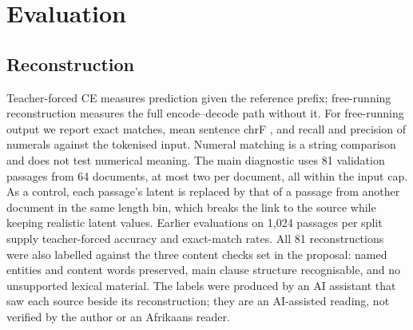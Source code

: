 \documentclass[11pt,a4paper]{article}
\begin{document}
\section{Evaluation}
\label{sec:evaluation}

\subsection{Reconstruction}
Teacher-forced CE measures prediction given the reference prefix; free-running reconstruction measures the full encode--decode path without it. For free-running output we report exact matches, mean sentence chrF \citep{popovic2015chrf}, and recall and precision of numerals against the tokenised input. Numeral matching is a string comparison and does not test numerical meaning. The main diagnostic uses 81 validation passages from 64 documents, at most two per document, all within the input cap. As a control, each passage's latent is replaced by that of a passage from another document in the same length bin, which breaks the link to the source while keeping realistic latent values. Earlier evaluations on 1,024 passages per split supply teacher-forced accuracy and exact-match rates. All 81 reconstructions were also labelled against the three content checks set in the proposal: named entities and content words preserved, main clause structure recognisable, and no unsupported lexical material. The labels were produced by an AI assistant that saw each source beside its reconstruction; they are an AI-assisted reading, not verified by the author or an Afrikaans reader.
\end{document}
